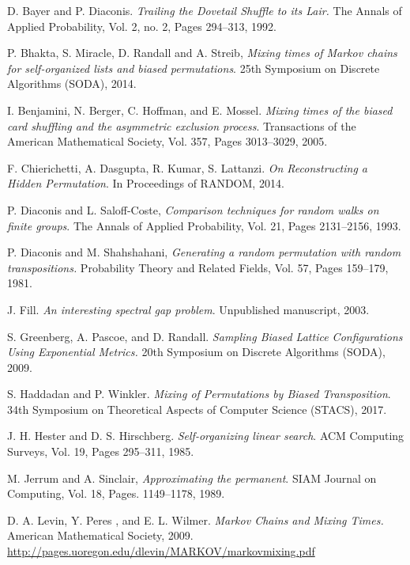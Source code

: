\documentclass[10 pt]{article}
\begin{document}
\begin{thebibliography}{10}

  D. Bayer and P. Diaconis. \emph{Trailing the Dovetail Shuffle to its Lair.} The Annals of Applied Probability,
    Vol. 2, no. 2, Pages 294--313, 1992.

  P. Bhakta, S. Miracle, D. Randall and A. Streib, \emph{Mixing times of Markov chains for self-organized lists and biased permutations}. 25th Symposium on Discrete Algorithms (SODA), 2014.

 I. Benjamini, N. Berger, C. Hoffman, and E. Mossel. \emph{Mixing times of the biased card shuffling and the asymmetric exclusion process}. Transactions of the American Mathematical Society, Vol. 357, Pages 3013--3029, 2005.

 F. Chierichetti, A. Dasgupta, R. Kumar, S. Lattanzi. \emph{
On Reconstructing a Hidden Permutation}. In Proceedings of RANDOM, 2014.

 P. Diaconis and L. Saloff-Coste, \emph{Comparison techniques for random walks on finite groups}.
The Annals of Applied Probability, Vol. 21, Pages 2131--2156, 1993.

 P. Diaconis and M. Shahshahani, \emph{Generating a random permutation with random transpositions.}
Probability Theory and Related Fields, Vol. 57, Pages 159--179, 1981.

 J. Fill. \emph{An interesting spectral gap problem}. Unpublished manuscript, 2003.

 S. Greenberg, A. Pascoe, and D. Randall. \emph{Sampling Biased
Lattice Configurations Using Exponential Metrics.} 20th Symposium on Discrete Algorithms (SODA), 2009.

  S. Haddadan and P. Winkler. \emph{Mixing of Permutations by Biased Transposition}.
{34th Symposium on Theoretical Aspects of Computer Science (STACS)}, 2017.

 J. H. Hester  and D. S. Hirschberg.  \emph{Self-organizing linear search}. ACM
Computing Surveys, Vol. 19, Pages 295--311, 1985.

 M. Jerrum and A. Sinclair, \emph{Approximating the permanent}. SIAM Journal on Computing, Vol. 18, Pages. 1149--1178, 1989.

 D. A. Levin, Y. Peres , and E. L. Wilmer. \emph{Markov Chains and Mixing Times.}  American Mathematical Society, 2009.\\
\href{http://pages.uoregon.edu/dlevin/MARKOV/markovmixing.pdf}{http://pages.uoregon.edu/dlevin/MARKOV/markovmixing.pdf}


\end{thebibliography}
\end{document}
